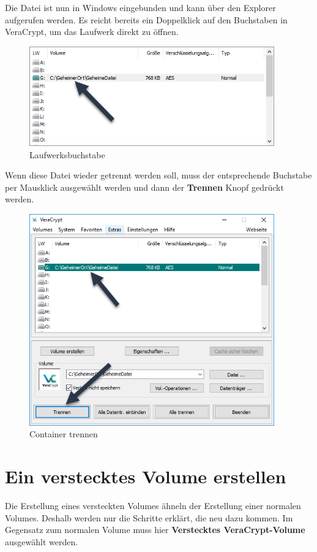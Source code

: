 \documentclass[12pt,a4paper]{scrreprt}
\begin{document}
\newpage

\noindent Die Datei ist nun in Windows eingebunden und kann über den Explorer aufgerufen werden. Es reicht bereits ein Doppelklick auf den Buchstaben in VeraCrypt, um das Laufwerk direkt zu öffnen.

\begin{figure}[h]
\begin{center}
\includegraphics[width=300pt]{media/containerletter.png}
\caption{Laufwerksbuchstabe}
\label{containerletter}
\end{center}
\end{figure}

\noindent Wenn diese Datei wieder getrennt werden soll, muss der entsprechende Buchstabe per Mausklick ausgewählt werden und dann der \textbf{Trennen} Knopf gedrückt werden.

\begin{figure}[h]
\begin{center}
\includegraphics[width=300pt]{media/disconnectcontainer.png}
\caption{Container trennen}
\label{disconnectcontainer}
\end{center}
\end{figure}

\newpage

\section{Ein verstecktes Volume erstellen}
Die Erstellung eines versteckten Volumes ähneln der Erstellung einer normalen Volumes. Deshalb werden nur die Schritte erklärt, die neu dazu kommen. Im Gegensatz zum normalen Volume muss hier \textbf{Verstecktes VeraCrypt-Volume} ausgewählt werden.
\end{document}
